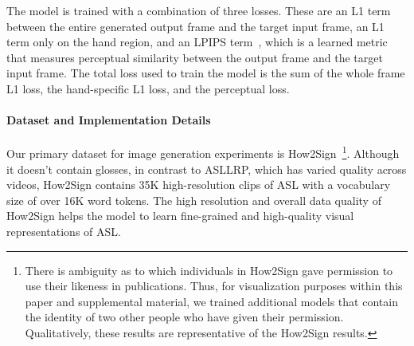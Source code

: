 The model is trained with a combination of three losses. These are an L1 term between the entire generated output frame and the target input frame, an L1 term only on the hand region, and an LPIPS term~\cite{zhang2018unreasonable}, which is a learned metric that measures perceptual similarity between the output frame and the target input frame. 
The total loss used to train the model is the sum of the whole frame L1 loss, the hand-specific L1 loss, and the perceptual loss.


\paragraph{Dataset and Implementation Details} 

Our primary dataset for image generation experiments is How2Sign~\cite{duarte_how2sign_2021}\footnote{There is ambiguity as to which individuals in How2Sign gave permission to use their likeness in publications. Thus, for visualization purposes within this paper and supplemental material, we trained additional models that contain the identity of two other people who have given their permission. Qualitatively, these results are representative of the How2Sign results.}.
Although it doesn't contain glosses, in contrast to ASLLRP, which has varied quality across videos, How2Sign contains 35K high-resolution clips of ASL with a vocabulary size of over 16K word tokens. The high resolution and overall data quality of How2Sign helps the model to learn fine-grained and high-quality visual representations of ASL. 

